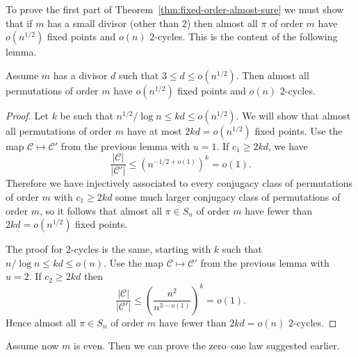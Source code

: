 \documentclass[ALCO,ThmDefs,Unicode,epreuves]{cedram}
\newcommand\calC{\mathcal{C}}
\newcommand\br[1]{\left({#1}\right)}
\newcommand\pfrac[2]{\br{\frac{#1}{#2}}}
\begin{document}
To prove the first part of Theorem~\ref{thm:fixed-order-almost-sure} we must show that if $m$ has a small divisor (other than $2$) then almost all $\pi$ of order $m$ have $o(n^{1/2})$ fixed points and $o(n)$ $2$-cycles. This is the content of the following lemma.

\begin{lemma} \label{good_m_calculation}
Assume $m$ has a divisor $d$ such that $3 \leq d \leq o(n^{1/2})$. Then almost all permutations of order $m$ have $o(n^{1/2})$ fixed points and $o(n)$ $2$-cycles.
\end{lemma}
\begin{proof}
Let $k$ be such that $n^{1/2}/ \log n \leq kd \leq o(n^{1/2})$. We will show that almost all permutations of order $m$ have at most $2kd = o(n^{1/2})$ fixed points. Use the map $\calC \mapsto \calC'$ from the previous lemma with $u=1$. If $c_1 \geq 2kd$, we have
\[
 \frac{|\calC|}{|\calC'|} \leq \left( n^{-1/2+o(1)}\right)^k =o(1).
\]
Therefore we have injectively associated to every conjugacy class of permutations of order $m$ with $c_1 \geq 2kd$ some much larger conjugacy class of permutations of order $m$, so it follows that almost all $\pi \in S_n$ of order $m$ have fewer than $2kd = o(n^{1/2})$ fixed points.

The proof for $2$-cycles is the same, starting with $k$ such that $n/ \log n \leq kd \leq o(n)$.
Use the map $\calC \mapsto \calC'$ from the previous lemma with $u=2$.
If $c_2 \geq 2kd$ then
\[
 \frac{|\calC|}{|\calC'|} \leq \pfrac{n^2}{n^{3-o(1)}}^k = o(1).
\]
Hence almost all $\pi \in S_n$ of order $m$ have fewer than $2kd = o(n)$ $2$-cycles.
\end{proof}

Assume now $m$ is even. Then we can prove the zero--one law suggested earlier.
\end{document}
